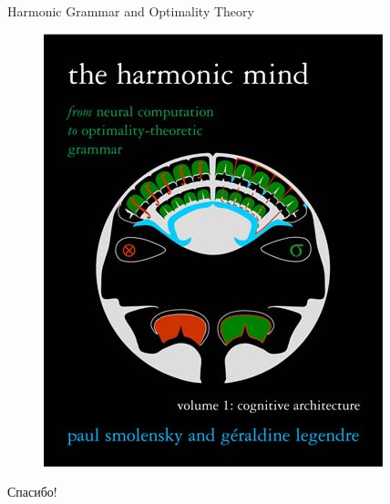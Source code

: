 \documentclass{beamer}
\begin{document}
\begin{frame}{Harmonic Grammar and Optimality Theory}
\begin{center}
	\begin{figure}[H]
		\includegraphics[scale=0.40]{harmonic.jpg} 
	\end{figure}
\end{center}
\end{frame}

\begin{frame}{}
    \thispagestyle{empty}
    \begin{center}
        {\large Спасибо!}
    \end{center}
\end{frame}
\end{document}
